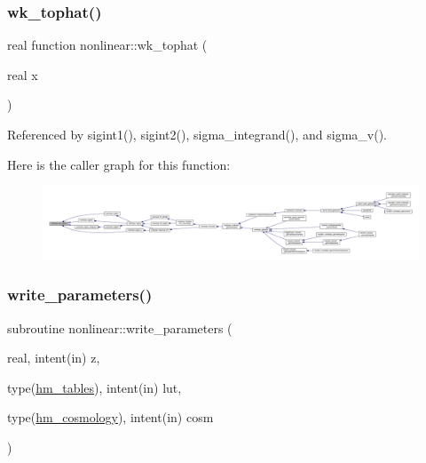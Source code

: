 \subsubsection{\texorpdfstring{wk\+\_\+tophat()}{wk\_tophat()}}
{\footnotesize\ttfamily real function nonlinear\+::wk\+\_\+tophat (\begin{DoxyParamCaption}\item[{real}]{x }\end{DoxyParamCaption})\hspace{0.3cm}{\ttfamily [private]}}



Referenced by sigint1(), sigint2(), sigma\+\_\+integrand(), and sigma\+\_\+v().

Here is the caller graph for this function\+:
\nopagebreak
\begin{figure}[H]
\begin{center}
\leavevmode
\includegraphics[width=350pt]{namespacenonlinear_a96a394ea7d173aec659a73ff09f548c6_icgraph}
\end{center}
\end{figure}
\mbox{\label{namespacenonlinear_abd2adda1e3c0e77617e1142893c4aa71}} 
\subsubsection{\texorpdfstring{write\+\_\+parameters()}{write\_parameters()}}
{\footnotesize\ttfamily subroutine nonlinear\+::write\+\_\+parameters (\begin{DoxyParamCaption}\item[{real, intent(in)}]{z,  }\item[{type(\mbox{\hyperlink{structnonlinear_1_1hm__tables}{hm\+\_\+tables}}), intent(in)}]{lut,  }\item[{type(\mbox{\hyperlink{structnonlinear_1_1hm__cosmology}{hm\+\_\+cosmology}}), intent(in)}]{cosm }\end{DoxyParamCaption})\hspace{0.3cm}{\ttfamily [private]}}



